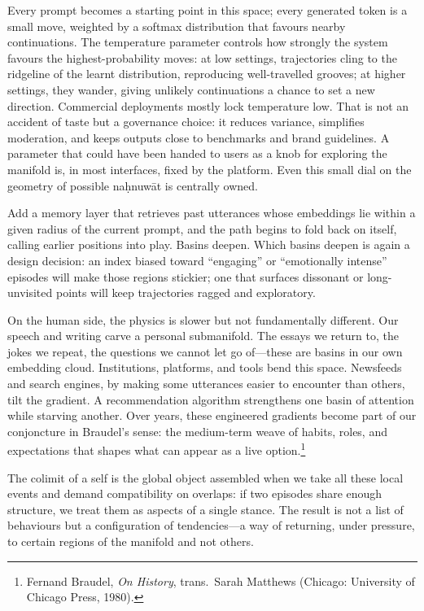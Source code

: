 \documentclass[12pt,a4paper]{article}
\begin{document}
Every prompt becomes a starting point in this space; every generated token is a small move, weighted by a softmax distribution that favours nearby continuations. The temperature parameter controls how strongly the system favours the highest-probability moves: at low settings, trajectories cling to the ridgeline of the learnt distribution, reproducing well-travelled grooves; at higher settings, they wander, giving unlikely continuations a chance to set a new direction. Commercial deployments mostly lock temperature low. That is not an accident of taste but a governance choice: it reduces variance, simplifies moderation, and keeps outputs close to benchmarks and brand guidelines. A parameter that could have been handed to users as a knob for exploring the manifold is, in most interfaces, fixed by the platform. Even this small dial on the geometry of possible na\d{h}nuw\={a}t is centrally owned.

Add a memory layer that retrieves past utterances whose embeddings lie within a given radius of the current prompt, and the path begins to fold back on itself, calling earlier positions into play. Basins deepen. Which basins deepen is again a design decision: an index biased toward ``engaging'' or ``emotionally intense'' episodes will make those regions stickier; one that surfaces dissonant or long-unvisited points will keep trajectories ragged and exploratory.

On the human side, the physics is slower but not fundamentally different. Our speech and writing carve a personal submanifold. The essays we return to, the jokes we repeat, the questions we cannot let go of---these are basins in our own embedding cloud. Institutions, platforms, and tools bend this space. Newsfeeds and search engines, by making some utterances easier to encounter than others, tilt the gradient. A recommendation algorithm strengthens one basin of attention while starving another. Over years, these engineered gradients become part of our conjoncture in Braudel's sense: the medium-term weave of habits, roles, and expectations that shapes what can appear as a live option.\footnote{Fernand Braudel, \emph{On History}, trans.\ Sarah Matthews (Chicago: University of Chicago Press, 1980).}

The colimit of a self is the global object assembled when we take all these local events and demand compatibility on overlaps: if two episodes share enough structure, we treat them as aspects of a single stance. The result is not a list of behaviours but a configuration of tendencies---a way of returning, under pressure, to certain regions of the manifold and not others.
\end{document}
